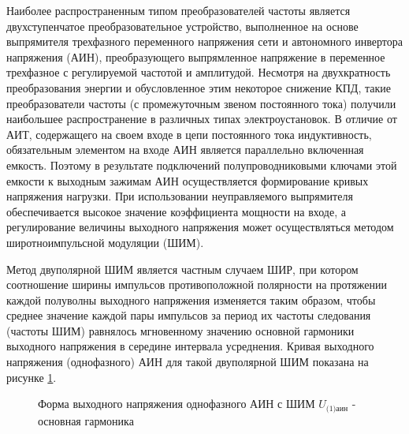         Наиболее распространенным типом преобразователей частоты является
        двухступенчатое преобразовательное устройство, выполненное на основе
        выпрямителя трехфазного переменного напряжения сети и автономного
        инвертора напряжения (АИН), преобразующего выпрямленное напряжение в
        переменное трехфазное с регулируемой частотой и амплитудой. Несмотря на
        двухкратность преобразования энергии и обусловленное этим некоторое
        снижение КПД, такие преобразователи частоты (с промежуточным звеном
        постоянного тока) получили наибольшее распространение в различных типах
        электроустановок. В отличие от АИТ, содержащего на своем входе в цепи
        постоянного тока индуктивность, обязательным элементом на входе АИН
        является параллельно включенная емкость. Поэтому в результате
        подключений полупроводниковыми ключами этой емкости к выходным зажимам
        АИН осуществляется формирование кривых напряжения нагрузки. При
        использовании неуправляемого выпрямителя обеспечивается высокое
        значение коэффициента мощности на входе, а регулирование величины
        выходного напряжения может осуществляться методом широтноимпульсной
        модуляции (ШИМ).

        Метод двуполярной ШИМ является частным случаем ШИР, при котором
        соотношение ширины импульсов противоположной полярности на протяжении
        каждой полуволны выходного напряжения изменяется таким образом, чтобы
        среднее значение каждой пары импульсов за период их частоты следования
        (частоты ШИМ) равнялось мгновенному значению основной гармоники
        выходного напряжения в середине интервала усреднения. Кривая выходного
        напряжения (однофазного) АИН для такой двуполярной ШИМ показана на
        рисунке \ref{fig:pwm}.

        \begin{figure}[h!]
            \caption{Форма выходного напряжения однофазного АИН с ШИМ
                $U_\text{(1)аин}$ - основная гармоника}
            \label{fig:pwm}
        \end{figure}
        
